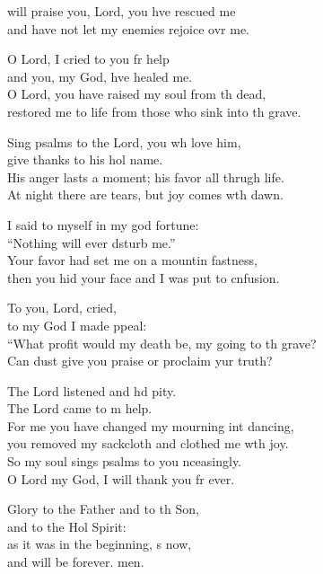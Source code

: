 \settowidth{\versewidth}{“What profit would my death be, my going to the grave? *}
\begin{psalmverse}%
  \begin{patverse}
 will praise you, Lord, you hve rescued me\Med\\
and have not let my enemies rejoice ovr me.

O Lord, I cried to you fr help\Med\\
and you, my God, hve healed me.\\
O Lord, you have raised my soul from th dead,\Med\\
restored me to life from those who sink into th grave.

Sing psalms to the Lord, you wh love him,\Med\\
give thanks to his hol name.\\
His anger lasts a moment; his favor all thrugh life.\Med\\
At night there are tears, but joy comes w\pointup{\i}th dawn.

I said to myself in my god fortune:\Med\\
“Nothing will ever d\pointup{\i}sturb me.”\\
Your favor had set me on a mountin fastness,\Med\\
then you hid your face and I was put to cnfusion.

To you, Lord,  cried,\Med\\
to my God I made ppeal:\\
“What profit would my death be, my going to th grave?\Med\\
Can dust give you praise or proclaim yur truth?

The Lord listened and hd pity.\Med\\
The Lord came to m help.\\
For me you have changed my mourning int dancing,\Med\\
you removed my sackcloth and clothed me w\pointup{\i}th joy.\\
So my soul sings psalms to you nceasingly.\Med\\
O Lord my God, I will thank you fr ever.

Glory to the Father and to th Son,\Med\\
and to the Hol Spirit:\\
as it was in the beginning, \pointup{\i}s now,\Med\\
and will be forever. men. 
  \end{patverse}
\end{psalmverse}
